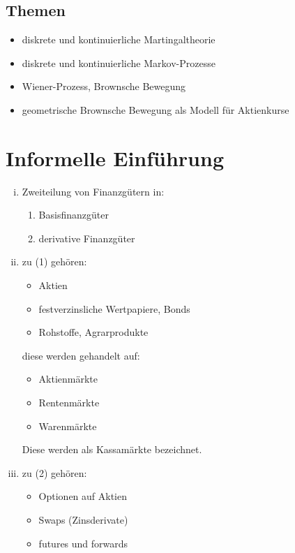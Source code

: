 \subsection*{Themen} %
\label{sub: themen}

\begin{itemize}
	\item diskrete und kontinuierliche Martingaltheorie
	\item diskrete und kontinuierliche Markov-Prozesse
	\item Wiener-Prozess, Brownsche Bewegung
	\item geometrische Brownsche Bewegung als Modell für Aktienkurse
\end{itemize}


\newpage

\setcounter{page}{1}


\section{Informelle Einführung} %
\label{sec: informelle_einführung}

\begin{enumerate}[(i)]
	\item Zweiteilung von Finanzgütern in:
	\begin{enumerate}[(1)]
		\item Basisfinanzgüter
		\item derivative Finanzgüter
	\end{enumerate}
	\item zu (1) gehören:
	\begin{itemize}
		\item Aktien
		\item festverzinsliche Wertpapiere, Bonds
		\item Rohstoffe, Agrarprodukte
	\end{itemize}
diese werden gehandelt auf:
	\begin{itemize}
		\item Aktienmärkte
		\item Rentenmärkte
		\item Warenmärkte
	\end{itemize}
Diese werden als Kassamärkte bezeichnet.

	\item zu (2) gehören:
	\begin{itemize}
		\item Optionen auf Aktien
		\item Swaps (Zinsderivate)
		\item futures und forwards
	\end{itemize}

\end{enumerate}

